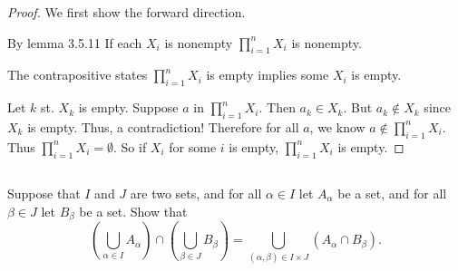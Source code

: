 \documentclass[../../main.tex]{subfiles}
\begin{document}
\begin{proof}
    We first show the forward direction.
    \begin{linebyline}
        \item By lemma 3.5.11 If each $X_i$ is nonempty $\prod_{i=1}^n X_i$ is nonempty.
        \item The contrapositive states $\prod_{i=1}^n X_i$ is empty implies some $X_i$ is empty.
    \end{linebyline}

    Let $k$ st. $X_k$ is empty.
        Suppose $a$ in $\prod_{i=1}^n X_i$.    
            Then $a_k \in X_k$.
            But $a_k \notin X_k$ since $X_k$ is empty.
            Thus, a contradiction!
        Therefore for all $a$, we know $a \notin \prod_{i=1}^n X_i$.
        Thus $\prod_{i=1}^n X_i = \emptyset$.
    So if $X_i$ for some $i$ is empty, $\prod_{i=1}^n X_i$ is empty. 


\end{proof}
\begin{xx}
    
\end{xx}

\subsection{}
\begin{q}
    Suppose that $I$ and $J$ are two sets, and for all $\alpha \in I$ let $A_{\alpha}$ be a set, and for all $\beta \in J$ let $B_{\beta}$ be a set. Show that
        \[
        \left(\bigcup_{\alpha \in I} A_{\alpha}\right) \cap \left(\bigcup_{\beta \in J} B_{\beta}\right) = \bigcup_{(\alpha, \beta) \in I \times J} \left(A_{\alpha} \cap B_{\beta}\right).
        \]
\end{q}
\end{document}
